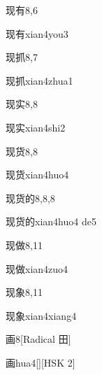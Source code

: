 \begin{entry}{现有}{8,6}
  \begin{phonetics}{现有}{xian4you3}
  \end{phonetics}
\end{entry}

\begin{entry}{现抓}{8,7}
  \begin{phonetics}{现抓}{xian4zhua1}
  \end{phonetics}
\end{entry}

\begin{entry}{现实}{8,8}
  \begin{phonetics}{现实}{xian4shi2}
  \end{phonetics}
\end{entry}

\begin{entry}{现货}{8,8}
  \begin{phonetics}{现货}{xian4huo4}
  \end{phonetics}
\end{entry}

\begin{entry}{现货的}{8,8,8}
  \begin{phonetics}{现货的}{xian4huo4 de5}
  \end{phonetics}
\end{entry}

\begin{entry}{现做}{8,11}
  \begin{phonetics}{现做}{xian4zuo4}
  \end{phonetics}
\end{entry}

\begin{entry}{现象}{8,11}
  \begin{phonetics}{现象}{xian4xiang4}
  \end{phonetics}
\end{entry}

\begin{entry}{画}{8}[Radical 田]
  \begin{phonetics}{画}{hua4}[][HSK 2]
  \end{phonetics}
\end{entry}

